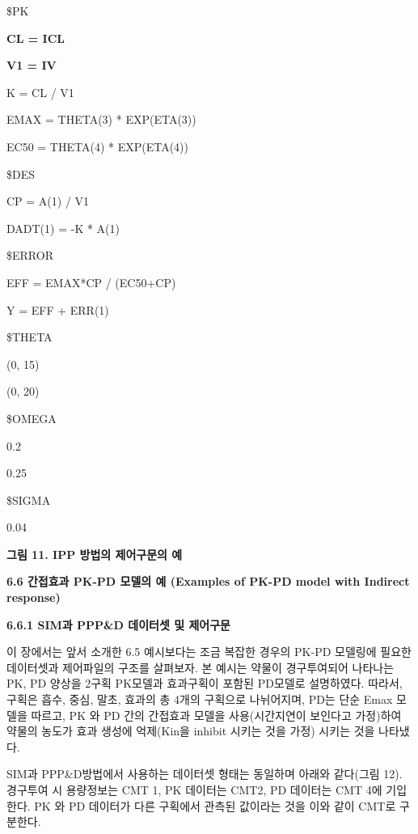 \documentclass[
  10pt,
]{krantz}
\begin{document}
\$PK

\textbf{CL = ICL}

\textbf{V1 = IV}

K = CL / V1

EMAX = THETA(3) * EXP(ETA(3))

EC50 = THETA(4) * EXP(ETA(4))

\$DES

CP = A(1) / V1

DADT(1) = -K * A(1)

\$ERROR

EFF = EMAX*CP / (EC50+CP)

Y = EFF + ERR(1)

\$THETA

(0, 15)

(0, 20)

\$OMEGA

0.2

0.25

\$SIGMA

0.04

\textbf{그림 11. IPP 방법의 제어구문의 예}

\textbf{6.6 간접효과 PK-PD 모델의 예 (Examples of PK-PD model with Indirect
response)}

\textbf{6.6.1 SIM과 PPP\&D 데이터셋 및 제어구문}

이 장에서는 앞서 소개한 6.5 예시보다는 조금 복잡한 경우의 PK-PD 모델링에 필요한 데이터셋과 제어파일의 구조를 살펴보자.
본 예시는 약물이 경구투여되어 나타나는 PK, PD 양상을 2구획 PK모델과 효과구획이 포함된 PD모델로 설명하였다. 따라서,
구획은 흡수, 중심, 말초, 효과의 총 4개의 구획으로 나뉘어지며, PD는 단순 Emax 모델을 따르고, PK 와 PD 간의
간접효과 모델을 사용(시간지연이 보인다고 가정)하여 약물의 농도가 효과 생성에 억제(Kin을 inhibit 시키는 것을
가정) 시키는 것을 나타냈다.

SIM과 PPP\&D방법에서 사용하는 데이터셋 형태는 동일하며 아래와 같다(그림 12). 경구투여 시 용량정보는 CMT 1, PK
데이터는 CMT2, PD 데이터는 CMT 4에 기입한다. PK 와 PD 데이터가 다른 구획에서 관측된 값이라는 것을 이와 같이
CMT로 구분한다.
\end{document}
